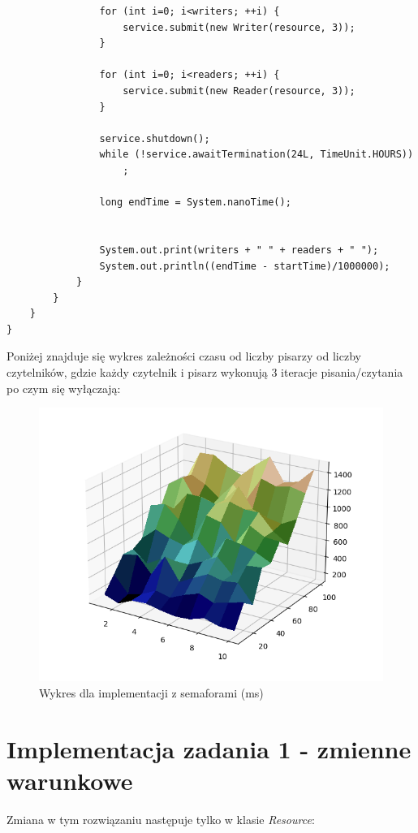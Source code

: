 \documentclass{article}
\begin{document}
\begin{verbatim}
                for (int i=0; i<writers; ++i) {
                    service.submit(new Writer(resource, 3));
                }

                for (int i=0; i<readers; ++i) {
                    service.submit(new Reader(resource, 3));
                }

                service.shutdown();
                while (!service.awaitTermination(24L, TimeUnit.HOURS)) 
                    ;

                long endTime = System.nanoTime();


                System.out.print(writers + " " + readers + " ");
                System.out.println((endTime - startTime)/1000000);
            }
        }
    }
}
\end{verbatim}

Poniżej znajduje się wykres zależności czasu od liczby pisarzy od liczby czytelników, gdzie każdy czytelnik
i pisarz wykonują 3 iteracje pisania/czytania po czym się wyłączają:

\begin{figure}[H]
    \centering
    \includegraphics[width=\textwidth]{figure_1.png}
    \caption{Wykres dla implementacji z semaforami (ms)}
\end{figure}

\section{Implementacja zadania 1 - zmienne warunkowe}

Zmiana w tym rozwiązaniu następuje tylko w klasie \textit{Resource}:
\end{document}
